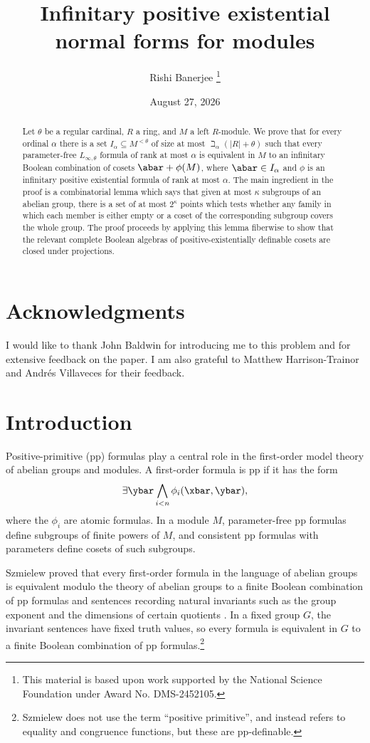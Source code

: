 \documentclass[11pt]{article}
\title{Infinitary positive existential normal forms for modules}
\author{Rishi Banerjee%
\thanks{This material is based upon work supported by the National Science Foundation under Award No. DMS-2452105.}}
\date{August 27, 2026}
\begin{document}
\maketitle

\begin{abstract}
    Let $\theta$ be a regular cardinal, $R$ a ring, and $M$ a left $R$-module. We prove that for every ordinal $\alpha$ there is a set $I_\alpha \subseteq M^{<\theta}$ of size at most $\beth_\alpha(|R| + \theta)$ such that every parameter-free $L_{\infty,\theta}$ formula of rank at most $\alpha$ is equivalent in $M$ to an infinitary Boolean combination of cosets $\abar + \phi(M)$, where $\abar \in I_\alpha$ and $\phi$ is an infinitary positive existential formula of rank at most $\alpha$. 
    The main ingredient in the proof is a combinatorial lemma which says that given at most $\kappa$ subgroups of an abelian group, there is a set of at most $2^\kappa$ points which tests whether any family in which each member is either empty or a coset of the corresponding subgroup covers the whole group.
    The proof proceeds by applying this lemma fiberwise to show that the relevant complete Boolean algebras of positive-existentially definable cosets are closed under projections. 
\end{abstract}


\section*{Acknowledgments}
    I would like to thank John Baldwin for introducing me to this problem and for extensive feedback on the paper. I am also grateful to Matthew Harrison-Trainor and Andr\'es Villaveces for their feedback.

\section{Introduction}

Positive-primitive (pp) formulas play a central role in the first-order model theory of abelian groups and modules. A first-order formula is pp if it has the form 
\[ \exists \ybar \bigwedge_{i < n} \phi_i(\xbar, \ybar), \]
where the $\phi_i$ are atomic formulas. 
In a module $M$, parameter-free pp formulas define subgroups of finite powers of $M$, and consistent pp formulas with parameters define cosets of such subgroups.

Szmielew proved that every first-order formula in the language of abelian groups is equivalent modulo the theory of abelian groups to a finite Boolean combination of pp formulas and sentences recording natural invariants such as the group exponent and the dimensions of certain quotients \cite{Szmielew1955}. In a fixed group $G$, the invariant sentences have fixed truth values, so every formula is equivalent in $G$ to a finite Boolean combination of pp formulas.\footnote{Szmielew does not use the term ``positive primitive'', and instead refers to equality and congruence functions, but these are pp-definable.}
\end{document}
